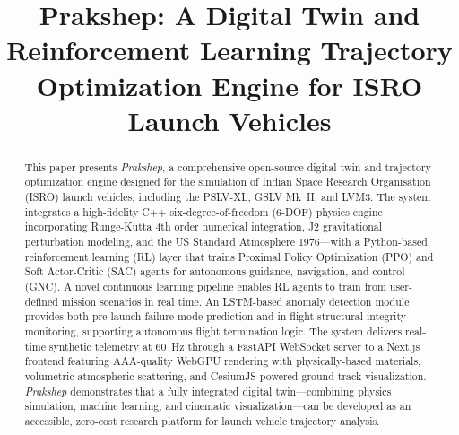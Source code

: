 \documentclass[conference]{IEEEtran}
\begin{document}
\title{Prakshep: A Digital Twin and Reinforcement Learning Trajectory Optimization Engine for ISRO Launch Vehicles}

\author{
}

\maketitle

\IEEEpeerreviewmaketitle

\begin{abstract}
This paper presents \textit{Prakshep}, a comprehensive open-source digital twin and trajectory optimization engine designed for the simulation of Indian Space Research Organisation (ISRO) launch vehicles, including the PSLV-XL, GSLV Mk~II, and LVM3. The system integrates a high-fidelity C++ six-degree-of-freedom (6-DOF) physics engine---incorporating Runge-Kutta 4th order numerical integration, J2 gravitational perturbation modeling, and the US Standard Atmosphere 1976---with a Python-based reinforcement learning (RL) layer that trains Proximal Policy Optimization (PPO) and Soft Actor-Critic (SAC) agents for autonomous guidance, navigation, and control (GNC). A novel continuous learning pipeline enables RL agents to train from user-defined mission scenarios in real time. An LSTM-based anomaly detection module provides both pre-launch failure mode prediction and in-flight structural integrity monitoring, supporting autonomous flight termination logic. The system delivers real-time synthetic telemetry at 60~Hz through a FastAPI WebSocket server to a Next.js frontend featuring AAA-quality WebGPU rendering with physically-based materials, volumetric atmospheric scattering, and CesiumJS-powered ground-track visualization. \textit{Prakshep} demonstrates that a fully integrated digital twin---combining physics simulation, machine learning, and cinematic visualization---can be developed as an accessible, zero-cost research platform for launch vehicle trajectory analysis.
\end{abstract}
\end{document}
